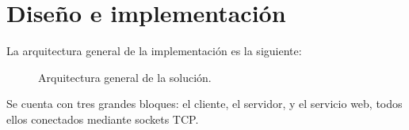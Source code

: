 \section{Diseño e implementación}

La arquitectura general de la implementación es la siguiente:

\begin{figure}[ht]
    
    \caption{Arquitectura general de la solución.}
\end{figure}

\clearpage

Se cuenta con tres grandes bloques: el cliente, el servidor, y el servicio web, todos ellos conectados mediante sockets TCP.




